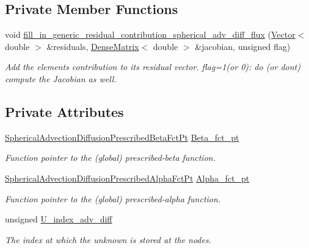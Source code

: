 \subsection*{Private Member Functions}
\begin{DoxyCompactItemize}
\item 
void \hyperlink{classoomph_1_1SphericalAdvectionDiffusionFluxElement_a7dd7a4627052f615642c64eea143e4c5}{fill\+\_\+in\+\_\+generic\+\_\+residual\+\_\+contribution\+\_\+spherical\+\_\+adv\+\_\+diff\+\_\+flux} (\hyperlink{classoomph_1_1Vector}{Vector}$<$ double $>$ \&residuals, \hyperlink{classoomph_1_1DenseMatrix}{Dense\+Matrix}$<$ double $>$ \&jacobian, unsigned flag)
\begin{DoxyCompactList}\small\item\em Add the element\textquotesingle{}s contribution to its residual vector. flag=1(or 0)\+: do (or don\textquotesingle{}t) compute the Jacobian as well. \end{DoxyCompactList}\end{DoxyCompactItemize}
\subsection*{Private Attributes}
\begin{DoxyCompactItemize}
\item 
\hyperlink{classoomph_1_1SphericalAdvectionDiffusionFluxElement_a1fe86f85817dd5621ab510d37b3a8ce8}{Spherical\+Advection\+Diffusion\+Prescribed\+Beta\+Fct\+Pt} \hyperlink{classoomph_1_1SphericalAdvectionDiffusionFluxElement_afac22354e3e360de61691047efe82be3}{Beta\+\_\+fct\+\_\+pt}
\begin{DoxyCompactList}\small\item\em Function pointer to the (global) prescribed-\/beta function. \end{DoxyCompactList}\item 
\hyperlink{classoomph_1_1SphericalAdvectionDiffusionFluxElement_aabc503a4eeac639334283e7297b88423}{Spherical\+Advection\+Diffusion\+Prescribed\+Alpha\+Fct\+Pt} \hyperlink{classoomph_1_1SphericalAdvectionDiffusionFluxElement_a0d9b714320a27d346fa8d0ccc1ef4148}{Alpha\+\_\+fct\+\_\+pt}
\begin{DoxyCompactList}\small\item\em Function pointer to the (global) prescribed-\/alpha function. \end{DoxyCompactList}\item 
unsigned \hyperlink{classoomph_1_1SphericalAdvectionDiffusionFluxElement_a03f3019943b1bd0d2818882c08f955f4}{U\+\_\+index\+\_\+adv\+\_\+diff}
\begin{DoxyCompactList}\small\item\em The index at which the unknown is stored at the nodes. \end{DoxyCompactList}\end{DoxyCompactItemize}
